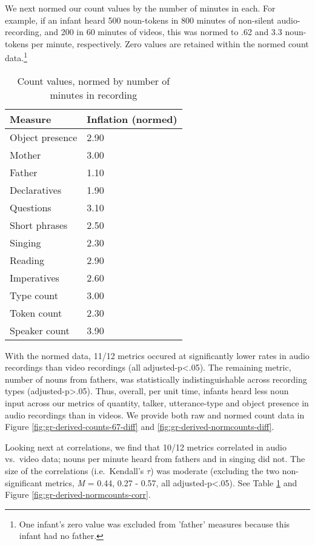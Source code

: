 \documentclass[floatsintext,man]{apa6}
\theoremstyle{definition}
\theoremstyle{definition}
\theoremstyle{definition}
\theoremstyle{remark}
\begin{document}
We next normed our count values by the number of minutes in each. For
example, if an infant heard 500 noun-tokens in 800 minutes of non-silent
audio-recording, and 200 in 60 minutes of videos, this was normed to .62
and 3.3 noun-tokens per minute, respectively. Zero values are retained
within the normed count
data.\footnote{One infant's zero value was excluded from 'father' measures because this infant had no father.}

\begin{table}[tbp]
\begin{center}
\begin{threeparttable}
\caption{\label{tab:normtable}Count values, normed by number of minutes in recording}
\small{
\begin{tabular}{ll}
\toprule
Measure & \multicolumn{1}{c}{Inflation (normed)}\\
\midrule
Object presence & 2.90\\
Mother & 3.00\\
Father & 1.10\\
Declaratives & 1.90\\
Questions & 3.10\\
Short phrases & 2.50\\
Singing & 2.30\\
Reading & 2.90\\
Imperatives & 2.60\\
Type count & 3.00\\
Token count & 2.30\\
Speaker count & 3.90\\
\bottomrule
\end{tabular}
}
\end{threeparttable}
\end{center}
\end{table}

With the normed data, 11/12 metrics occured at significantly lower rates
in audio recordings than video recordings (all
adjusted-p\textless{}.05). The remaining metric, number of nouns from
fathers, was statistically indistinguishable across recording types
(adjusted-p\textgreater{}.05). Thus, overall, per unit time, infants
heard less noun input across our metrics of quantity, talker,
utterance-type and object presence in audio recordings than in videos.
We provide both raw and normed count data in Figure
\ref{fig:gr-derived-counts-67-diff} and
\ref{fig:gr-derived-normcounts-diff}.

Looking next at correlations, we find that 10/12 metrics correlated in
audio vs.~video data; nouns per minute heard from fathers and in singing
did not. The size of the correlations (i.e.~Kendall's \(\tau\)) was
moderate (excluding the two non-significant metrics, \emph{M} = 0.44,
0.27 - 0.57, all adjusted-p\textless{}.05). See Table
\ref{tab:normtable} and Figure \ref{fig:gr-derived-normcounts-corr}.
\end{document}
